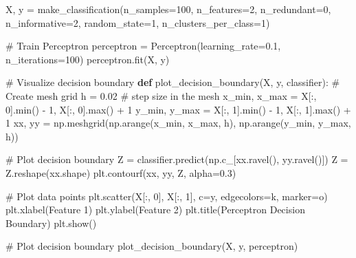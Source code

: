 \documentclass[
  letterpaper,
  DIV=11,
  numbers=noendperiod]{scrreprt}
\newenvironment{Shaded}{\begin{snugshade}}{\end{snugshade}}
\newcommand{\BuiltInTok}[1]{\textcolor[rgb]{0.00,0.23,0.31}{#1}}
\newcommand{\CommentTok}[1]{\textcolor[rgb]{0.37,0.37,0.37}{#1}}
\newcommand{\DecValTok}[1]{\textcolor[rgb]{0.68,0.00,0.00}{#1}}
\newcommand{\FloatTok}[1]{\textcolor[rgb]{0.68,0.00,0.00}{#1}}
\newcommand{\KeywordTok}[1]{\textcolor[rgb]{0.00,0.23,0.31}{\textbf{#1}}}
\newcommand{\NormalTok}[1]{\textcolor[rgb]{0.00,0.23,0.31}{#1}}
\newcommand{\OperatorTok}[1]{\textcolor[rgb]{0.37,0.37,0.37}{#1}}
\newcommand{\StringTok}[1]{\textcolor[rgb]{0.13,0.47,0.30}{#1}}
\begin{document}
\begin{Shaded}
\begin{Highlighting}[]
\NormalTok{X, y }\OperatorTok{=}\NormalTok{ make\_classification(n\_samples}\OperatorTok{=}\DecValTok{100}\NormalTok{, n\_features}\OperatorTok{=}\DecValTok{2}\NormalTok{, n\_redundant}\OperatorTok{=}\DecValTok{0}\NormalTok{, n\_informative}\OperatorTok{=}\DecValTok{2}\NormalTok{, random\_state}\OperatorTok{=}\DecValTok{1}\NormalTok{, n\_clusters\_per\_class}\OperatorTok{=}\DecValTok{1}\NormalTok{)}

\CommentTok{\# Train Perceptron}
\NormalTok{perceptron }\OperatorTok{=}\NormalTok{ Perceptron(learning\_rate}\OperatorTok{=}\FloatTok{0.1}\NormalTok{, n\_iterations}\OperatorTok{=}\DecValTok{100}\NormalTok{)}
\NormalTok{perceptron.fit(X, y)}

\CommentTok{\# Visualize decision boundary}
\KeywordTok{def}\NormalTok{ plot\_decision\_boundary(X, y, classifier):}
    \CommentTok{\# Create mesh grid}
\NormalTok{    h }\OperatorTok{=} \FloatTok{0.02}  \CommentTok{\# step size in the mesh}
\NormalTok{    x\_min, x\_max }\OperatorTok{=}\NormalTok{ X[:, }\DecValTok{0}\NormalTok{].}\BuiltInTok{min}\NormalTok{() }\OperatorTok{{-}} \DecValTok{1}\NormalTok{, X[:, }\DecValTok{0}\NormalTok{].}\BuiltInTok{max}\NormalTok{() }\OperatorTok{+} \DecValTok{1}
\NormalTok{    y\_min, y\_max }\OperatorTok{=}\NormalTok{ X[:, }\DecValTok{1}\NormalTok{].}\BuiltInTok{min}\NormalTok{() }\OperatorTok{{-}} \DecValTok{1}\NormalTok{, X[:, }\DecValTok{1}\NormalTok{].}\BuiltInTok{max}\NormalTok{() }\OperatorTok{+} \DecValTok{1}
\NormalTok{    xx, yy }\OperatorTok{=}\NormalTok{ np.meshgrid(np.arange(x\_min, x\_max, h), np.arange(y\_min, y\_max, h))}
    
    \CommentTok{\# Plot decision boundary}
\NormalTok{    Z }\OperatorTok{=}\NormalTok{ classifier.predict(np.c\_[xx.ravel(), yy.ravel()])}
\NormalTok{    Z }\OperatorTok{=}\NormalTok{ Z.reshape(xx.shape)}
\NormalTok{    plt.contourf(xx, yy, Z, alpha}\OperatorTok{=}\FloatTok{0.3}\NormalTok{)}
    
    \CommentTok{\# Plot data points}
\NormalTok{    plt.scatter(X[:, }\DecValTok{0}\NormalTok{], X[:, }\DecValTok{1}\NormalTok{], c}\OperatorTok{=}\NormalTok{y, edgecolors}\OperatorTok{=}\StringTok{\textquotesingle{}k\textquotesingle{}}\NormalTok{, marker}\OperatorTok{=}\StringTok{\textquotesingle{}o\textquotesingle{}}\NormalTok{)}
\NormalTok{    plt.xlabel(}\StringTok{\textquotesingle{}Feature 1\textquotesingle{}}\NormalTok{)}
\NormalTok{    plt.ylabel(}\StringTok{\textquotesingle{}Feature 2\textquotesingle{}}\NormalTok{)}
\NormalTok{    plt.title(}\StringTok{\textquotesingle{}Perceptron Decision Boundary\textquotesingle{}}\NormalTok{)}
\NormalTok{    plt.show()}

\CommentTok{\# Plot decision boundary}
\NormalTok{plot\_decision\_boundary(X, y, perceptron)}
\end{Highlighting}
\end{Shaded}
\end{document}
